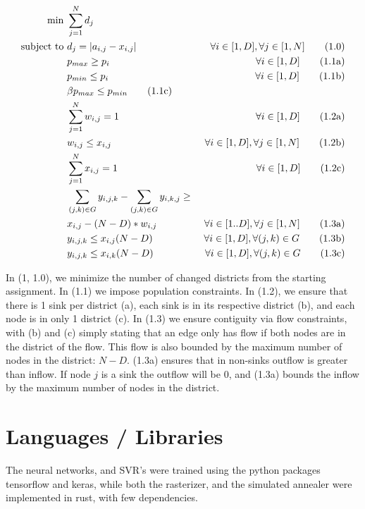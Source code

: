 \documentclass{article}
\begin{document}
\begin{align}
	\min & \ \sum_{j=1}^{N}d_j                                                                                                         \\
	\text{subject to}
	     & \ d_j=|a_{i,j}-x_{i,j}|                                               & \ \forall i\in[1,D], \forall j\in[1,N] \tag{1.0}    \\
	     & \ p_{max} \geq p_i                                                    & \ \forall i\in[1,D] \tag {1.1a}                     \\
	     & \ p_{min} \leq p_i                                                    & \ \forall i\in[1,D] \tag {1.1b}                     \\
	     & \ \beta p_{max}\leq p_{min} \tag {1.1c}                                                                                     \\
	     & \ \sum_{j=1}^N w_{i,j} = 1                                            & \ \forall i\in[1,D] \tag {1.2a}                     \\
	     & \ w_{i,j} \leq x_{i,j}                                                & \ \forall i\in[1,D], \forall j\in[1,N] \tag {1.2b}  \\
	     & \ \sum_{j=1}^N x_{i,j} = 1                                            & \ \forall i\in[1,D] \tag {1.2c}                     \\
	     & \ \sum_{(j,k)\in G}y_{i,j,k} - \sum_{(j,k)\in G}y_{i,k,j} \geq \notag                                                       \\
	     & \ x_{i,j} - (N-D) * w_{i,j}                                           & \ \forall i\in[1..D], \forall j\in[1,N] \tag {1.3a} \\
	     & \ y_{i,j,k} \leq x_{i,j} (N-D)                                        & \ \forall i\in[1,D],\forall (j,k)\in G \tag {1.3b}  \\
	     & \ y_{i,j,k} \leq x_{i,k} (N-D)                                        & \ \forall i\in[1,D],\forall (j,k)\in G \tag {1.3c}
\end{align}

In (1, 1.0), we minimize the number of changed districts from the starting
assignment. In (1.1) we impose population constraints. In (1.2), we ensure that
there is 1 sink per district (a), each sink is in its respective district (b),
and each node is in only 1 district (c). In (1.3) we ensure contiguity via flow
constraints, with (b) and (c) simply stating that an edge only has flow if both
nodes are in the district of the flow. This flow is also bounded by the maximum
number of nodes in the district: $N-D$. (1.3a) ensures that in non-sinks
outflow is greater than inflow. If node $j$ is a sink the outflow will be 0,
and (1.3a) bounds the inflow by the maximum number of nodes in the district.

\section{Languages / Libraries}
The neural networks, and SVR's were trained using the python packages
tensorflow and keras, while both the rasterizer, and the simulated annealer
were implemented in rust, with few dependencies.
\end{document}

